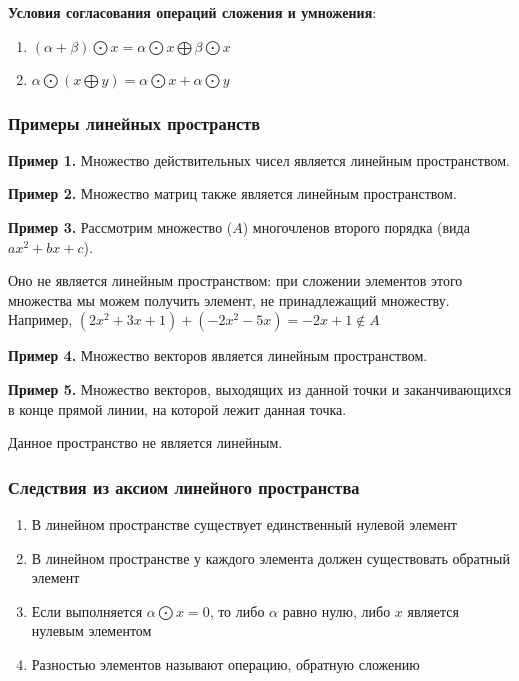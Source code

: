 \documentclass{article}
\begin{document}
\begin{flushleft}
\hfill

\textbf{Условия согласования операций сложения и умножения}:

\begin{enumerate}
    \item $(\alpha + \beta) \bigodot x = \alpha \bigodot x \bigoplus \beta \bigodot x$
    \item $\alpha \bigodot (x \bigoplus y) = \alpha \bigodot x + \alpha \bigodot y$
\end{enumerate}

\subsubsection{Примеры линейных пространств}

\textbf{Пример 1.} Множество действительных чисел является линейным пространством.

\hfill

\textbf{Пример 2.} Множество матриц также является линейным пространством.

\hfill

\textbf{Пример 3.} Рассмотрим множество ($A$) многочленов второго порядка (вида $ax^2 + bx + c$).

Оно не является линейным пространством: при сложении элементов этого множества мы можем получить элемент, не принадлежащий множеству. Например, $(2x^2 + 3x + 1) + (-2x^2 - 5x) = -2x + 1 \notin A$

\hfill

\textbf{Пример 4.} Множество векторов является линейным пространством.

\hfill

\textbf{Пример 5.} Множество векторов, выходящих из данной точки и заканчивающихся в конце прямой линии, на которой лежит данная точка.

Данное пространство не является линейным.

\subsubsection{Следствия из аксиом линейного пространства}

\begin{enumerate}
    \item В линейном пространстве существует единственный нулевой элемент
    \item В линейном пространстве у каждого элемента должен существовать обратный элемент
    \item Если выполняется $\alpha \bigodot x = 0$, то либо $\alpha$ равно нулю, либо $x$ является нулевым элементом
    \item Разностью элементов называют операцию, обратную сложению
\end{enumerate}


\end{flushleft}
\end{document}
